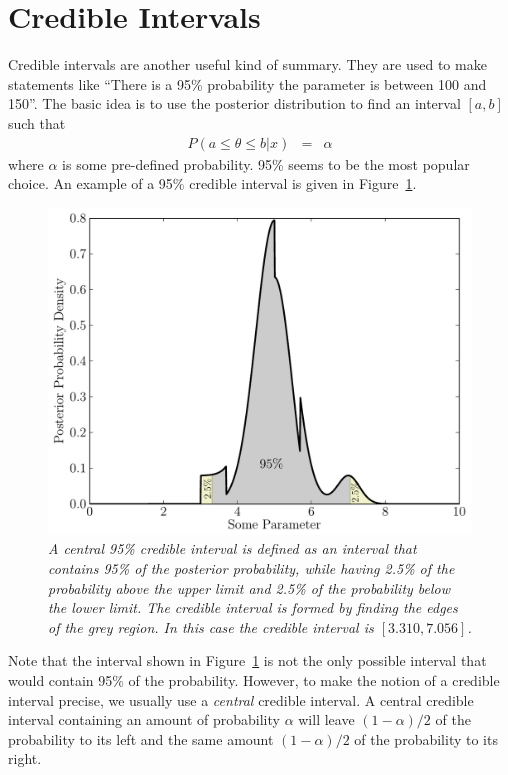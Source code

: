 \section{Credible Intervals}
Credible intervals are another useful kind of summary. They are used to make
statements like ``There is a 95\% probability the parameter is between
100 and 150''. The basic idea is to
use the posterior distribution to find an interval $[a, b]$ such that
\begin{eqnarray}
P(a \leq \theta \leq b | x) &=& \alpha
\end{eqnarray}
where $\alpha$ is some pre-defined probability. 95\% seems to be the
most popular choice. An example of a 95\% credible interval is given in
Figure~\ref{fig:credible_interval}.

\begin{figure}[!ht]
\begin{center}
\includegraphics[scale=0.5]{Figures/credible_interval.pdf}
\caption{\it A central 95\% credible interval is defined as an interval that
contains 95\% of the posterior probability, while having 2.5\% of the probability
above the upper limit and 2.5\% of the probability below the lower limit. The
credible interval is formed by finding the edges of the grey region. In this
case the credible interval is $[3.310, 7.056]$.
\label{fig:credible_interval}}
\end{center}
\end{figure}
Note that the interval shown in Figure~\ref{fig:credible_interval} is not the
only possible interval that would contain 95\% of the probability. However, to
make the notion of a credible interval precise, we usually use a {\it central}
credible interval. A central credible interval containing an amount of probability
$\alpha$ will leave $(1-\alpha)/2$ of the probability to its left and
the same amount $(1-\alpha)/2$ of the probability to its right.

